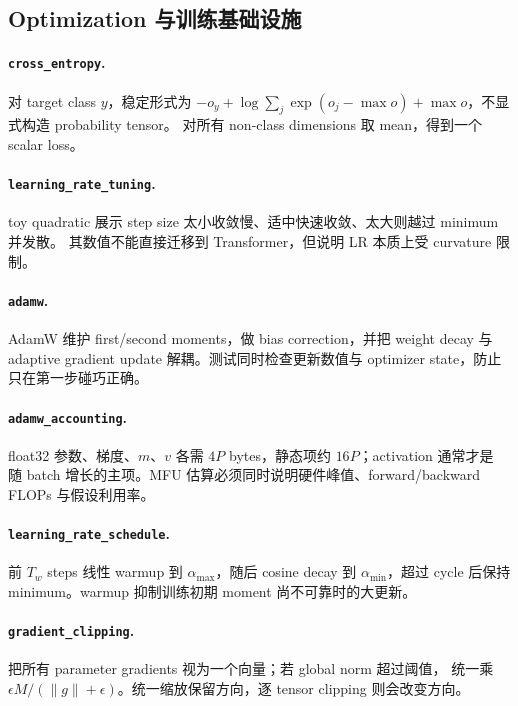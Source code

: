 \subsection{Optimization 与训练基础设施}
\paragraph{\texttt{cross\_entropy}.}
对 target class $y$，稳定形式为
$-o_y+\log\sum_j\exp(o_j-\max o)+\max o$，不显式构造 probability tensor。
对所有 non-class dimensions 取 mean，得到一个 scalar loss。

\paragraph{\texttt{learning\_rate\_tuning}.}
toy quadratic 展示 step size 太小收敛慢、适中快速收敛、太大则越过 minimum 并发散。
其数值不能直接迁移到 Transformer，但说明 LR 本质上受 curvature 限制。

\paragraph{\texttt{adamw}.}
AdamW 维护 first/second moments，做 bias correction，并把 weight decay 与 adaptive
gradient update 解耦。测试同时检查更新数值与 optimizer state，防止只在第一步碰巧正确。

\paragraph{\texttt{adamw\_accounting}.}
float32 参数、梯度、$m$、$v$ 各需 $4P$ bytes，静态项约 $16P$；activation 通常才是
随 batch 增长的主项。MFU 估算必须同时说明硬件峰值、forward/backward FLOPs 与假设利用率。

\paragraph{\texttt{learning\_rate\_schedule}.}
前 $T_w$ steps 线性 warmup 到 $\alpha_{\max}$，随后 cosine decay 到
$\alpha_{\min}$，超过 cycle 后保持 minimum。warmup 抑制训练初期 moment 尚不可靠时的大更新。

\paragraph{\texttt{gradient\_clipping}.}
把所有 parameter gradients 视为一个向量；若 global norm 超过阈值，
统一乘 $\epsilon M/(\|g\|+\epsilon)$。统一缩放保留方向，逐 tensor clipping 则会改变方向。

